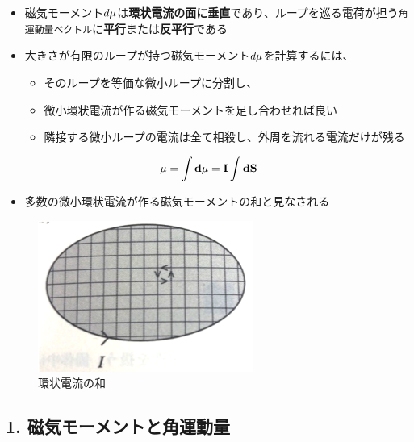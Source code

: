 \documentclass[11pt]{article}
\makeatletter
\def\maxwidth{\ifdim\Gin@nat@width>\linewidth\linewidth
    \else\Gin@nat@width\fi}
\let\Oldincludegraphics\includegraphics
\renewcommand{\includegraphics}[1]{\Oldincludegraphics[width=.8\maxwidth]{#1}}
\providecommand{\tightlist}{%
      \setlength{\itemsep}{0pt}\setlength{\parskip}{0pt}}
\makeatother
\begin{document}
    \begin{itemize}
\item
  磁気モーメント\(d{\bf \mu}\)は\textbf{環状電流の面に垂直}であり、ループを巡る電荷が担う\texttt{角運動量ベクトル}に\textbf{平行}または\textbf{反平行}である
\item
  大きさが有限のループが持つ磁気モーメント\(d{\bf \mu}\)を計算するには、

  \begin{itemize}
  \item
    そのループを等価な微小ループに分割し、
  \item
    微小環状電流が作る磁気モーメントを足し合わせれば良い
  \item
    隣接する微小ループの電流は全て相殺し、外周を流れる電流だけが残る
  \end{itemize}
\end{itemize}

\begin{eqnarray}
\bf \mu =\int d{\bf \mu} = I \int d{\bf S}
\end{eqnarray}

\begin{itemize}
\tightlist
\item
  多数の微小環状電流が作る磁気モーメントの和と見なされる
\end{itemize}

\begin{figure}
\centering
\includegraphics{./images/環状電流の和.png}
\caption{環状電流の和}
\end{figure}

    \subsection{1.
磁気モーメントと角運動量}\label{ux78c1ux6c17ux30e2ux30fcux30e1ux30f3ux30c8ux3068ux89d2ux904bux52d5ux91cf}
\end{document}
